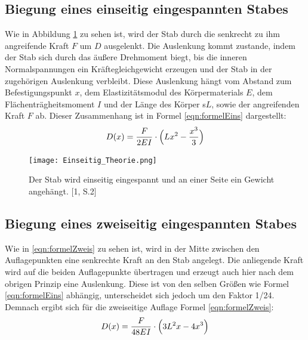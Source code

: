 \documentclass[titlepage = firstcover]{scrartcl}
\begin{document}
        \subsection{Biegung eines einseitig eingespannten Stabes}
          Wie in Abbildung \ref{fig:theorieEins} zu sehen ist, wird der Stab durch die senkrecht zu ihm angreifende Kraft $F$ um $D$ 
          ausgelenkt. Die Auslenkung kommt zustande, indem der Stab sich durch das äußere Drehmoment biegt, bis die 
          inneren Normalspannungen ein Kräftegleichgewicht erzeugen und der Stab in der zugehörigen Auslenkung verbleibt.
          Diese Auslenkung hängt vom Abstand zum Befestigungspunkt $x$, dem Elastizitätsmodul des Körpermaterials $E$, 
          dem Flächenträgheitsmoment $I$ und der Länge des Körper s$L$, sowie der angreifenden Kraft $F$ ab. Dieser 
          Zusammenhang ist in Formel \eqref{eqn:formelEins} dargestellt:
          \begin{equation}
            D(x) = \frac{F}{2EI} \cdot \Bigl(Lx^2 - \frac{x^3}{3}\Bigr)
            \label{eqn:formelEins}
          \end{equation}

          \begin{figure}[h]
            \centering
            \texttt{[image: Einseitig\_Theorie.png]}
            \caption{Der Stab wird einseitig eingespannt und an einer Seite ein Gewicht angehängt. [1, S.2]}
            \label{fig:theorieEins}
          \end{figure}
      
        \subsection{Biegung eines zweiseitig eingespannten Stabes}
          Wie in \ref{eqn:formelZweis} zu sehen ist, wird in der Mitte zwischen den Auflagepunkten eine senkrechte Kraft an
          den Stab angelegt. Die anliegende Kraft wird auf die beiden Auflagepunkte übertragen und erzeugt auch hier nach 
          dem obrigen Prinzip eine Auslenkung. Diese ist von den selben Größen wie Formel \eqref{eqn:formelEins} abhängig, 
          unterscheidet sich jedoch um den Faktor 1/24. Demnach ergibt sich für die zweiseitige Auflage Formel 
          \eqref{eqn:formelZweis}:
          \begin{equation}
            D(x) = \frac{F}{48EI} \cdot \Bigl(3L^2x - 4x^3\Bigr)
            \label{eqn:formelZweis}
          \end{equation}
\end{document}
